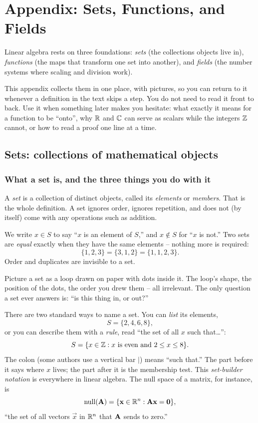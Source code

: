 \chapter{Appendix: Sets, Functions, and Fields}

Linear algebra rests on three foundations: \emph{sets} (the collections objects live
in), \emph{functions} (the maps that transform one set into another), and \emph{fields}
(the number systems where scaling and division work).

This appendix collects them in one place, with pictures, so you can return to it whenever a
definition in the text skips a step. You do not need to read it front to back. Use it when something later makes you
hesitate: what exactly it means for a function to be ``onto'', why $\mathbb{R}$ and $\mathbb{C}$ can serve
as scalars while the integers $\mathbb{Z}$ cannot, or how to read a proof one line at a time.

\chapterline

\section{Sets: collections of mathematical objects}

\subsection{What a set is, and the three things you do with it}

A \emph{set} is a collection of distinct objects, called its \emph{elements} or
\emph{members}. That is the whole definition. A set ignores order, ignores repetition, and
does not (by itself) come with any operations such as addition.

We write $x \in S$ to say ``$x$ is an element of $S$,'' and $x \notin S$ for ``$x$ is
not.'' Two sets are \emph{equal} exactly when they have the same elements -- nothing more
is required:
\[
  \{1,2,3\} = \{3,1,2\} = \{1,1,2,3\}.
\]
Order and duplicates are invisible to a set.

\begin{intuitionbox}
Picture a set as a loop drawn on paper with dots inside it. The loop's shape, the
position of the dots, the order you drew them -- all irrelevant. The only question a set
ever answers is: ``is this thing in, or out?''
\end{intuitionbox}

There are two standard ways to name a set. You can \emph{list} its elements,
\[
  S = \{2, 4, 6, 8\},
\]
or you can describe them with a \emph{rule}, read ``the set of all $x$ such that\ldots'':
\[
  S = \{x \in \mathbb{Z} : x \text{ is even and } 2 \le x \le 8\}.
\]
The colon (some authors use a vertical bar $\mid$) means ``such that.'' The part before
it says where $x$ lives; the part after it is the membership test. This
\emph{set-builder notation} is everywhere in linear algebra. The null space of a matrix, for instance, is
\[
  \operatorname{null}(\mathbf{A}) = \{\mathbf{x} \in \mathbb{R}^n : \mathbf{A}\mathbf{x} = \mathbf{0}\},
\]
``the set of all vectors $\vec{x}$ in $\mathbb{R}^n$ that $\mathbf{A}$ sends to zero.''

